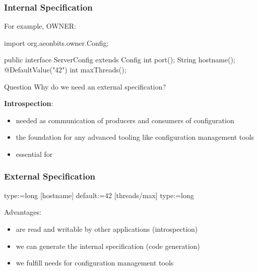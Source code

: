 \begin{frame}[fragile]
	\frametitle{Internal Specification}

	For example, OWNER:
	\begin{code}[gobble=4,language=Java]
	import org.aeonbits.owner.Config;

	public interface ServerConfig extends Config {
		int port();
		String hostname();
		@DefaultValue("42")
		int maxThreads();
	}
	\end{code}
\end{frame}

\begin{frame}
	\begin{alertblock}{Question}
	Why do we need an external specification?
	\end{alertblock}

	\pause
	\vspace{1em}

	\textbf{Introspection}:
	\begin{itemize}
	\item needed as communication of producers and consumers of configuration
	\item the foundation for any advanced tooling like configuration management tools
	\item essential for ~\citet{holland2001nofutz}
	\end{itemize}
\end{frame}

\begin{frame}[fragile]
	\frametitle{External Specification}

	\begin{code}[gobble=4]
	[port]
	type:=long
	[hostname]
	default:=42
	[threads/max]
	type:=long
	\end{code}

	\vspace{1em}

	Advantages:
	\pause
	\begin{itemize}
	\item are read and writable by other applications (introspection)
	\item we can generate the internal specification (code generation)
	\item we fulfill needs for configuration management tools
	\end{itemize}
\end{frame}

